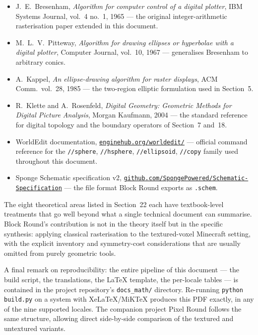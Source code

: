 \documentclass[12pt,a4paper]{scrartcl}
\newcommand{\code}[1]{\texttt{\small #1}}
\newcommand{\cmd}[1]{\textcolor{earth}{\texttt{\small #1}}}
\newcommand{\biblink}[2]{\href{#1}{\nolinkurl{#2}}}
\begin{document}
\begin{itemize}[leftmargin=1.4em,itemsep=0.2em,topsep=0.3em]
  \item J.~E.~Bresenham, \emph{Algorithm for computer control of a digital plotter}, IBM Systems Journal, vol.~4 no.~1, 1965 --- the original integer-arithmetic rasterisation paper extended in this document.
  \item M.~L.~V.~Pitteway, \emph{Algorithm for drawing ellipses or hyperbolae with a digital plotter}, Computer Journal, vol.~10, 1967 --- generalises Bresenham to arbitrary conics.
  \item A.~Kappel, \emph{An ellipse-drawing algorithm for raster displays}, ACM Comm.\ vol.~28, 1985 --- the two-region elliptic formulation used in Section~5.
  \item R.~Klette and A.~Rosenfeld, \emph{Digital Geometry: Geometric Methods for Digital Picture Analysis}, Morgan Kaufmann, 2004 --- the standard reference for digital topology and the boundary operators of Section~7 and~18.
  \item WorldEdit documentation, \biblink{https://enginehub.org/worldedit/}{enginehub.org/worldedit/} --- official command reference for the \cmd{//sphere}, \cmd{//hsphere}, \cmd{//ellipsoid}, \cmd{//copy} family used throughout this document.
  \item Sponge Schematic specification v2, \biblink{https://github.com/SpongePowered/Schematic-Specification}{github.com/SpongePowered/Schematic-Specification} --- the file format Block Round exports as \code{.schem}.
\end{itemize}

The eight theoretical areas listed in Section~22 each have textbook-level treatments that go well beyond what a single technical document can summarise. Block Round's contribution is not in the theory itself but in the specific synthesis: applying classical rasterisation to the textured-voxel Minecraft setting, with the explicit inventory and symmetry-cost considerations that are usually omitted from purely geometric tools.

A final remark on reproducibility: the entire pipeline of this document --- the build script, the translations, the LaTeX template, the per-locale tables --- is contained in the project repository's \code{docs\_math/} directory. Re-running \code{python build.py} on a system with XeLaTeX/MiKTeX produces this PDF exactly, in any of the nine supported locales. The companion project Pixel Round follows the same structure, allowing direct side-by-side comparison of the textured and untextured variants.
\end{document}
